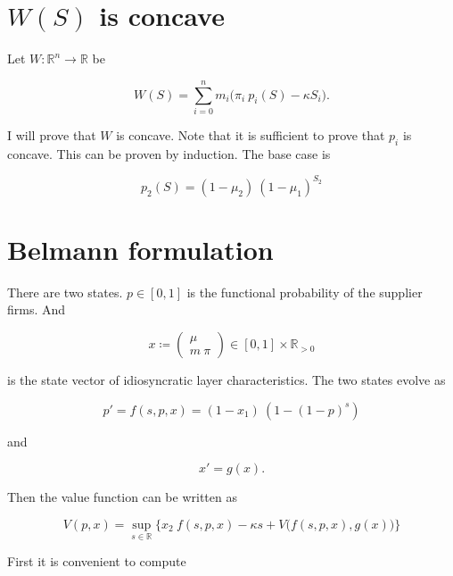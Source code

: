 \documentclass[american, abstract=on]{scrartcl}
\renewcommand{\Re}{\mathbb{R}}
\begin{document}
\newpage
\appendix
\section[Concavity of social planner problem]{$W(S)$ is concave}

Let $W: \Re^n \to \Re$ be

\begin{equation}
  W(S) = \sum^n_{i = 0} m_i \Big( \pi_i \ p_i(S) - \kappa S_i \Big).
\end{equation}

I will prove that $W$ is concave. Note that it is sufficient to prove that $p_i$ is concave. This can be proven by induction. The base case is 

\begin{equation}
  p_2(S) = (1 - \mu_2) \ (1 - \mu_1)^{S_2}
\end{equation}

\section{Belmann formulation}

There are two states. $p \in [0, 1]$ is the functional probability of the supplier firms. And 

\begin{equation}
  x \coloneqq \begin{pmatrix}
    \mu \\ m \ \pi
  \end{pmatrix} \in [0, 1] \times \Re_{>0}
\end{equation}

is the state vector of idiosyncratic layer characteristics. The two states evolve as

\begin{equation}
  p' = f(s, p, x) = (1 - x_1) \ (1 - (1 - p)^s)
\end{equation}

and

\begin{equation}
  x' = g(x).
\end{equation}

Then the value function can be written as 

\begin{equation}
  V(p, x) = \sup_{s \in \Re} \Big\{ x_2 \ f(s, p, x) - \kappa s + V\Big(f(s, p, x), g(x)\Big) \Big\}
\end{equation}

First it is convenient to compute
\end{document}
